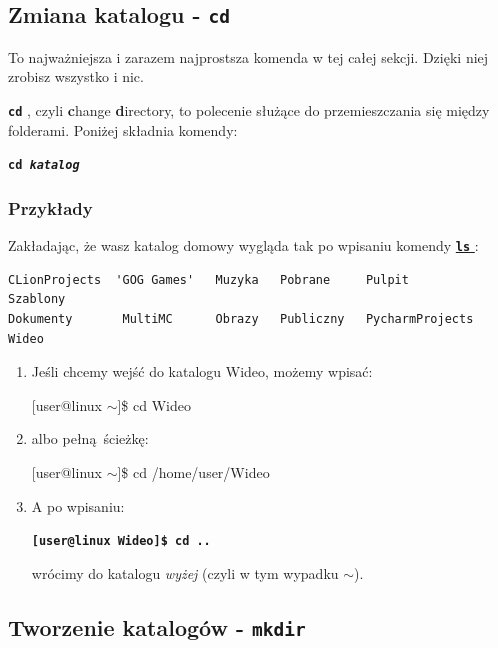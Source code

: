 \documentclass[12pt]{article}
\makeatletter
\newcommand{\ttbf}[1]{
    \texttt{\textbf{#1}}
}
\newenvironment{console1}
{
    \ttfamily
    \fontseries{b}
    \selectfont
    {[}user@linux $\sim${]}\$} {

    }
\makeatother
\begin{document}
\subsection{Zmiana katalogu - \ttbf{cd}}
\label{sec:cd}

To najważniejsza i zarazem najprostsza komenda w tej całej sekcji. Dzięki niej zrobisz wszystko i nic.

\ttbf{cd}, czyli \textbf{c}hange \textbf{d}irectory, to polecenie służące do przemieszczania się między folderami. Poniżej składnia komendy:

\ttbf{cd \emph{katalog}}

\subsubsection{Przykłady}

Zakładając, że wasz katalog domowy wygląda tak po wpisaniu komendy \hyperref[sec:ls]{\ttbf{ls}}:

\begin{verbatim}
CLionProjects  'GOG Games'   Muzyka   Pobrane     Pulpit            Szablony
Dokumenty       MultiMC      Obrazy   Publiczny   PycharmProjects   Wideo
\end{verbatim}

\begin{enumerate}
    \item Jeśli chcemy wejść do katalogu Wideo, możemy wpisać:

    \begin{console1}
        cd Wideo
    \end{console1}

    \item albo pełną ścieżkę:

    \begin{console1}
        cd /home/user/Wideo
    \end{console1}

    \item A po wpisaniu:

    \ttbf{[user@linux Wideo]\$ cd ..}
    
    wrócimy do katalogu \emph{wyżej} (czyli w tym wypadku $\sim$).
\end{enumerate}

\subsection{Tworzenie katalogów - \ttbf{mkdir}}
\end{document}
